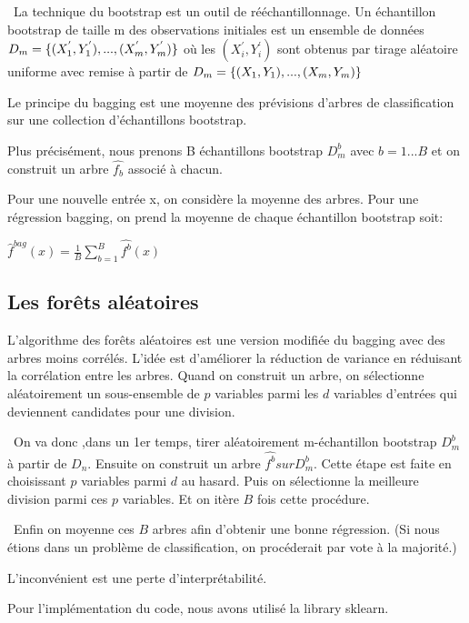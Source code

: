\documentclass[a4paper,oneside,11pt]{article}
\begin{document}
\ La technique du bootstrap est un outil de rééchantillonnage.
Un échantillon bootstrap de taille m des observations initiales est un ensemble de données
$D_{m}=\{(X_{1}^{'},Y_{1}^{'}),...,(X_{m}^{'},Y_{m}^{'})\}\newline$
où les $(X_{i}^{'},Y_{i}^{'})$ sont obtenus par tirage aléatoire uniforme avec remise à partir de 
$D_{m}=\{(X_{1},Y_{1}),...,(X_{m},Y_{m})\}\newline$

Le principe du bagging est une moyenne des prévisions d'arbres de classification sur une collection d'échantillons bootstrap.

Plus précisément, nous prenons B échantillons bootstrap $D_{m}^{b}$ avec $b=1...B$ et on construit un arbre $\hat{f_b}$ associé à chacun.

Pour une nouvelle entrée x, on considère la moyenne des arbres. Pour une régression bagging, on prend la moyenne de chaque échantillon bootstrap soit:

$\hat{f}^{bag}(x)=\frac{1}{B}\sum_{b=1}^{B}\hat{f^{b}}(x)$

\subsection*{Les forêts aléatoires}
%

\qquad L'algorithme des forêts aléatoires est une version modifiée du bagging avec des arbres moins corrélés.
L'idée est d'améliorer la réduction de variance en réduisant la corrélation entre les arbres. Quand on construit un arbre, on sélectionne aléatoirement un sous-ensemble de $p$ variables parmi les $d$ variables d'entrées qui deviennent candidates pour une division.

\ On va donc ,dans un 1er temps, tirer aléatoirement m-échantillon bootstrap $D_m^b$ à partir de $D_n$.
Ensuite on construit un arbre $\hat{f^b} sur D_m^b$. Cette étape est faite en choisissant $p$ variables parmi $d$ au hasard. Puis on sélectionne la meilleure division parmi ces $p$ variables. Et on itère $B$ fois cette procédure.

\ Enfin on moyenne ces $B$ arbres afin d'obtenir une bonne régression. (Si nous étions dans un problème de classification, on procéderait par vote à la majorité.)

L'inconvénient est une perte d'interprétabilité.


Pour l'implémentation du code, nous avons utilisé la library sklearn.
\end{document}
